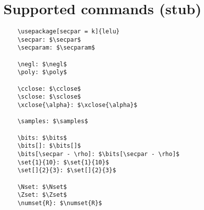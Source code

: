 \documentclass{article}
\begin{document}
\section{Supported commands (stub)}

\begin{lstlisting}
    \usepackage[secpar = k]{lelu}
    \secpar: $\secpar$
    \secparam: $\secparam$

    \negl: $\negl$
    \poly: $\poly$

    \cclose: $\cclose$
    \sclose: $\sclose$
    \xclose{\alpha}: $\xclose{\alpha}$ 

    \samples: $\samples$

    \bits: $\bits$
    \bits[]: $\bits[]$
    \bits[\secpar - \rho]: $\bits[\secpar - \rho]$
    \set{1}{10}: $\set{1}{10}$
    \set[]{2}{3}: $\set[]{2}{3}$

    \Nset: $\Nset$
    \Zset: $\Zset$
    \numset{R}: $\numset{R}$

\end{lstlisting}
    
\end{document}
